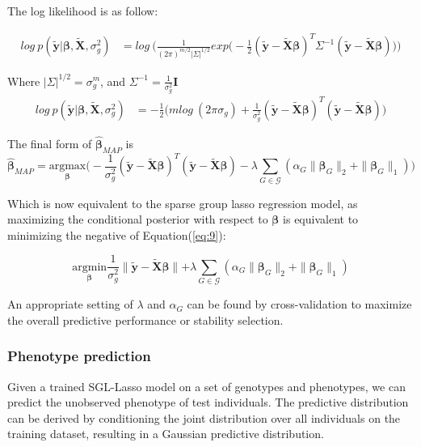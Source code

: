 \documentclass[11pt]{article}
\theoremstyle{plain}
\theoremstyle{definition}
\theoremstyle{remark}
\begin{document}
The log likelihood is as follow:

\begin{equation*}
\begin{aligned}
log\ p(\bm{\tilde{y}}|\bm{\beta},\bm{\tilde{X}},\sigma_g^2)&=log\ \Bigg(\frac{1}{(2\pi)^{m/2}|\Sigma|^{1/2}}exp\Big(-\frac{1}{2}(\bm{\tilde{y}}-\bm{\tilde{X}\beta})^T\Sigma^{-1}(\bm{\tilde{y}}-\bm{\tilde{X}\beta})\Big)\Bigg)
\end{aligned}
\end{equation*}

Where $|\Sigma|^{1/2}=\sigma_g^m$, and $\Sigma^{-1}=\frac{1}{\sigma_g^2}\bm{I}$
\begin{equation*}
\begin{aligned}
log\ p(\bm{\tilde{y}}|\bm{\beta},\bm{\tilde{X}},\sigma_g^2)&=-\frac{1}{2}\Big(mlog\ (2\pi\sigma_g)+\frac{1}{\sigma_g^2}(\bm{\tilde{y}}-\bm{\tilde{X}\beta})^T(\bm{\tilde{y}}-\bm{\tilde{X}\beta})\Big)
\end{aligned}
\end{equation*}

The final form of $\hat{\bm\beta}_{MAP}$ is
\begin{equation}
\label{eq:9}
\hat{\bm\beta}_{MAP}=\underset{\bm{\beta}}{\mathrm{argmax}}\Big(-\frac{1}{\sigma_g^2}(\bm{\tilde{y}}-\bm{\tilde{X}\beta})^T(\bm{\tilde{y}}-\bm{\tilde{X}\beta})-\lambda\sum_{G\in\mathcal{G}}(\alpha_G\parallel\bm{\beta}_G\parallel_2+\parallel\bm{\beta}_G\parallel_1)\Big)
\end{equation}

Which is now equivalent to the sparse group lasso regression model, as maximizing the conditional posterior with respect to $\bm{\beta}$ is equivalent to minimizing the negative of Equation(\ref{eq:9}):

\begin{equation}
\underset{\bm{\beta}}{\mathrm{argmin}}\frac{1}{\sigma_g^2}\parallel\bm{\tilde{y}}-\bm{\tilde{X}\beta}\parallel+\lambda\sum_{G\in\mathcal{G}}(\alpha_G\parallel\bm{\beta}_G\parallel_2+\parallel\bm{\beta}_G\parallel_1)
\end{equation}

An appropriate setting of $\lambda$ and $\alpha_G$ can be found by cross-validation to maximize the overall predictive performance or stability selection.


\subsubsection{Phenotype prediction}
Given a trained SGL-Lasso model on a set of genotypes and phenotypes, we can predict the unobserved phenotype of test individuals. The predictive distribution can be derived by conditioning the joint distribution over all individuals on the training dataset, resulting in a Gaussian predictive distribution.
\end{document}

